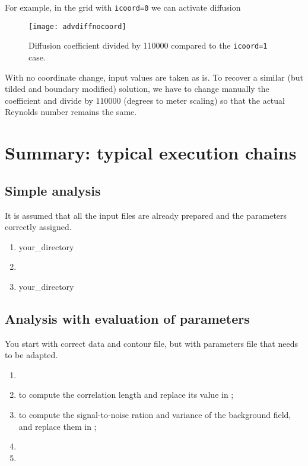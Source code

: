 For example, in the grid with \texttt{icoord=0} we can activate diffusion

\begin{figure}[H]
\centering
\texttt{[image: advdiffnocoord]}
\caption{Diffusion coefficient divided by 110000 compared to the 
\texttt{icoord=1} case.}
\end{figure}


With no coordinate change, input values are taken as is. To recover a similar (but tilded and boundary modified) solution, we have to change manually the coefficient and divide by $110000$ (degrees to meter scaling) so that the actual Reynolds number remains the same.


\section{Summary: typical execution chains}


\subsection{Simple analysis}

It is assumed that all the input files are already prepared and the parameters correctly assigned.

\begin{enumerate}
\item {} your\_directory
\item {}
\item {} your\_directory
\end{enumerate}



\subsection{Analysis with evaluation of parameters}

You start with correct data and contour file, but with parameters file that needs to be adapted.

\begin{enumerate}
\item {}
\item {} \qquad to compute the correlation length and replace its value in ;
\item {} \qquad to compute the signal-to-noise ration and variance of the background field, and replace them in ;
\item {}
\item {}
\end{enumerate}


